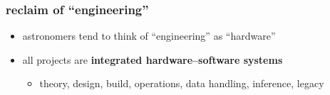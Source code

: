 \documentclass{beamer}
\renewcommand{\emph}[1]{\textbf{#1}}
\begin{document}
\begin{frame}
  \frametitle{reclaim of ``engineering''}
  \begin{itemize}
  \item astronomers tend to think of ``engineering'' as ``hardware''
  \item all projects are \emph{integrated hardware--software systems}
    \begin{itemize}
    \item theory, design, build, operations, data handling, inference, legacy
    \end{itemize}
  \end{itemize}
\end{frame}
\end{document}
